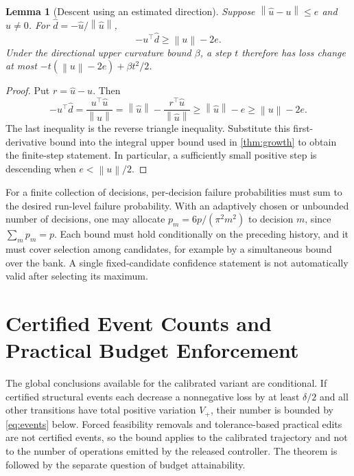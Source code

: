 \documentclass[10pt]{article}
\theoremstyle{paper}
\newtheorem{lemma}[theorem]{Lemma}
\newcommand{\norm}[1]{\left\lVert #1\right\rVert}
\begin{document}
\begin{lemma}[Descent using an estimated direction]
\label{lem:estimateddirection}
Suppose $\norm{\widehat u-u}\le e$ and $\widehat u\ne0$. For $\widehat d=-\widehat u/\norm{\widehat u}$,
\[
-u^\top\widehat d\ge\norm u-2e.
\]
Under the directional upper curvature bound $\beta$, a step $t$ therefore has loss change at most $-t(\norm u-2e)+\beta t^2/2$.
\end{lemma}
\begin{proof}
Put $r=\widehat u-u$. Then
\[
-u^\top\widehat d=\frac{u^\top\widehat u}{\norm{\widehat u}}
=\norm{\widehat u}-\frac{r^\top\widehat u}{\norm{\widehat u}}
\ge\norm{\widehat u}-e\ge\norm u-2e.
\]
The last inequality is the reverse triangle inequality. Substitute this first-derivative bound into the integral upper bound used in \cref{thm:growth} to obtain the finite-step statement. In particular, a sufficiently small positive step is descending when $e<\norm u/2$.
\end{proof}

For a finite collection of decisions, per-decision failure probabilities must sum to the desired run-level failure probability. With an adaptively chosen or unbounded number of decisions, one may allocate $p_m=6p/(\pi^2m^2)$ to decision $m$, since $\sum_mp_m=p$. Each bound must hold conditionally on the preceding history, and it must cover selection among candidates, for example by a simultaneous bound over the bank. A single fixed-candidate confidence statement is not automatically valid after selecting its maximum.

\section{Certified Event Counts and Practical Budget Enforcement}
\label{app:events}
The global conclusions available for the calibrated variant are conditional. If certified structural events each decrease a nonnegative loss by at least $\delta/2$ and all other transitions have total positive variation $V_+$, their number is bounded by \cref{eq:events} below. Forced feasibility removals and tolerance-based practical edits are not certified events, so the bound applies to the calibrated trajectory and not to the number of operations emitted by the released controller. The theorem is followed by the separate question of budget attainability.
\end{document}
